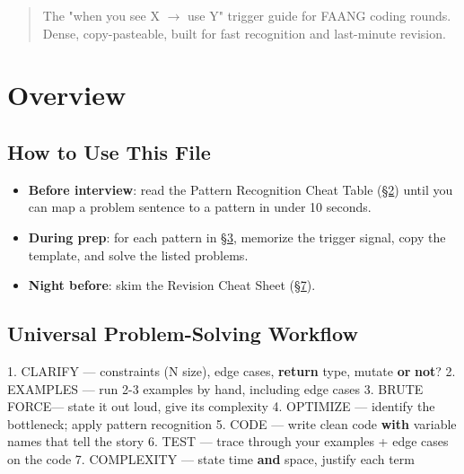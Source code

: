 \documentclass[11pt]{article}
\providecommand{\tightlist}{\setlength{\itemsep}{1pt}\setlength{\parskip}{0pt}}
\newenvironment{Shaded}{\begin{snugshade}}{\end{snugshade}}
\newcommand{\BuiltInTok}[1]{\textcolor[rgb]{0.50,0.55,0.55}{#1}}
\newcommand{\ControlFlowTok}[1]{\textcolor[rgb]{0.99,0.74,0.29}{\textbf{#1}}}
\newcommand{\DecValTok}[1]{\textcolor[rgb]{0.96,0.45,0.00}{#1}}
\newcommand{\FloatTok}[1]{\textcolor[rgb]{0.96,0.45,0.00}{#1}}
\newcommand{\KeywordTok}[1]{\textcolor[rgb]{0.81,0.81,0.76}{\textbf{#1}}}
\newcommand{\NormalTok}[1]{\textcolor[rgb]{0.81,0.81,0.76}{#1}}
\newcommand{\OperatorTok}[1]{\textcolor[rgb]{0.81,0.81,0.76}{#1}}
\begin{document}
\makecoverpage

\thispagestyle{empty}
{\hypersetup{hidelinks}\tableofcontents}
\clearpage

\begin{quote}
The "when you see X \(\rightarrow\) use Y" trigger guide for FAANG coding rounds.
Dense, copy-pasteable, built for fast recognition and last-minute revision.
\end{quote}

\section{Overview}\label{overview}

\subsection{How to Use This File}\label{how-to-use-this-file}

\begin{itemize}
\tightlist
\item
  \textbf{Before interview}: read the Pattern Recognition Cheat Table (\hyperlink{section.2}{\textcolor{acc}{§2}}) until you can map a problem sentence to a pattern in under 10 seconds.
\item
  \textbf{During prep}: for each pattern in \hyperlink{section.3}{\textcolor{acc}{§3}}, memorize the trigger signal, copy the template, and solve the listed problems.
\item
  \textbf{Night before}: skim the Revision Cheat Sheet (\hyperlink{section.7}{\textcolor{acc}{§7}}).
\end{itemize}

\subsection{Universal Problem-Solving Workflow}\label{universal-problem-solving-workflow}


\begin{Shaded}
\begin{Highlighting}[]
\FloatTok{1.}\NormalTok{ CLARIFY    — constraints (N size), edge cases, }\ControlFlowTok{return} \BuiltInTok{type}\NormalTok{, mutate }\KeywordTok{or} \KeywordTok{not}\NormalTok{?}
\FloatTok{2.}\NormalTok{ EXAMPLES   — run }\DecValTok{2}\OperatorTok{{-}}\DecValTok{3}\NormalTok{ examples by hand, including edge cases}
\FloatTok{3.}\NormalTok{ BRUTE FORCE— state it out loud, give its complexity}
\FloatTok{4.}\NormalTok{ OPTIMIZE   — identify the bottleneck}\OperatorTok{;} \BuiltInTok{apply}\NormalTok{ pattern recognition}
\FloatTok{5.}\NormalTok{ CODE       — write clean code }\ControlFlowTok{with}\NormalTok{ variable names that tell the story}
\FloatTok{6.}\NormalTok{ TEST       — trace through your examples }\OperatorTok{+}\NormalTok{ edge cases on the code}
\FloatTok{7.}\NormalTok{ COMPLEXITY — state time }\KeywordTok{and}\NormalTok{ space, justify each term}
\end{Highlighting}
\end{Shaded}
\end{document}
